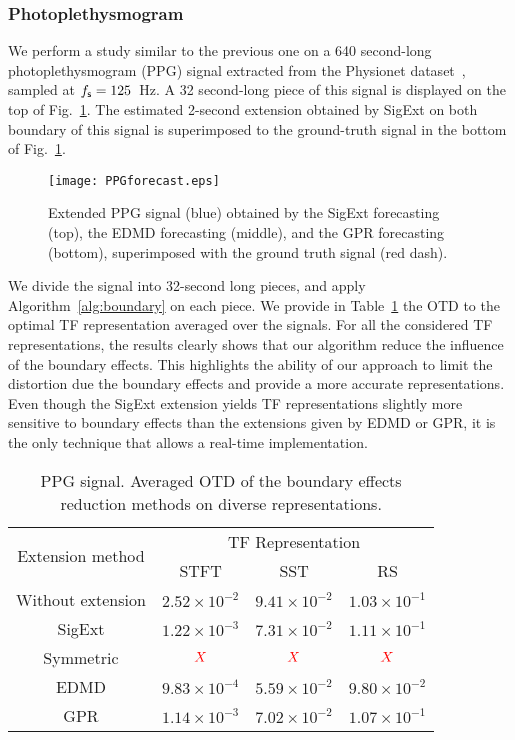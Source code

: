 \subsubsection{Photoplethysmogram}
\label{ssse:ppg}
We perform a study similar to the previous one on a 640 second-long photoplethysmogram (PPG) signal extracted from the Physionet dataset~\cite{Pimentel17toward, Goldberger00physiobank}, sampled at $f_{\mathsf s}=125$~Hz. A 32 second-long piece of this signal is displayed on the top of Fig.~\ref{fig:ppg}. The estimated 2-second extension obtained by {\sf SigExt} on both boundary of this signal is superimposed to the ground-truth signal in the bottom of Fig.~\ref{fig:ppg}.

\begin{figure}
\texttt{[image: PPGforecast.eps]}
\caption{Extended PPG signal (blue) obtained by the {\sf SigExt} forecasting (top), the EDMD forecasting (middle), and the GPR forecasting (bottom), superimposed with the ground truth signal (red dash).}
\label{fig:ppg}
\end{figure}

We divide the signal into 32-second long pieces, and apply Algorithm~\ref{alg:boundary} on each piece. We provide in Table~\ref{tab:otd.ppg} the OTD to the optimal TF representation averaged over the signals. For all the considered TF representations, the results clearly shows that our algorithm reduce the influence of the boundary effects. This highlights the ability of our approach to limit the distortion due the boundary effects and provide a more accurate representations. Even though the {\sf SigExt} extension yields TF representations slightly more sensitive to boundary effects than the extensions given by EDMD or GPR, it is the only technique that allows a real-time implementation.

\begin{table}
\centering
\caption{PPG signal. Averaged OTD of the boundary effects reduction methods on diverse representations.}
\begin{tabular}{|c||c|c|c|}
  \hline
   \multirow{2}{*}{Extension method} & \multicolumn{3}{c|}{TF Representation} \\
   \cline{2-4}
      & STFT & SST & RS\\
   \hhline{|=#=|=|=|}
   Without extension & $2.52\times 10^{-2}$ & $9.41\times 10^{-2}$ & $1.03\times 10^{-1}$ \\
   \hline
   {\sf SigExt} & $1.22\times 10^{-3}$ & $7.31\times 10^{-2}$ & $1.11\times 10^{-1}$ \\
   \hline
   Symmetric & ${\color{red}X}$ & ${\color{red}X}$ & ${\color{red}X}$ \\
   \hline
   EDMD & $9.83\times 10^{-4}$ & $5.59\times 10^{-2}$ & $9.80\times 10^{-2}$ \\
   \hline
   GPR & $1.14\times 10^{-3}$ & $7.02\times 10^{-2}$ & $1.07\times 10^{-1}$ \\
   \hline
\end{tabular}
\label{tab:otd.ppg}
\end{table}

